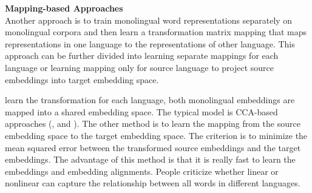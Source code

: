 \textbf{Mapping-based Approaches}\\
Another approach is to train monolingual word representations separately on monolingual corpora and then learn a transformation matrix mapping that maps representations in one language to the representations of other language.  This approach can be further divided into learning separate mappings for each language or learning mapping only for source language to project source embeddings into target embedding space.

learn the transformation for each language, both monolingual embeddings are mapped into a shared embedding space. The typical model is CCA-based approaches (\cite{faruqui2014improving}, \cite{dhillon2011multi} and \cite{lu2015deep}). The other method is to learn the mapping from the source embedding space to the target embedding space. The criterion is to minimize the mean squared error between the transformed source embeddings and the target embeddings. The advantage of this method is that it is really fast to learn the embeddings and embedding alignments. People criticize whether linear or nonlinear can capture the relationship between all words in different languages.
